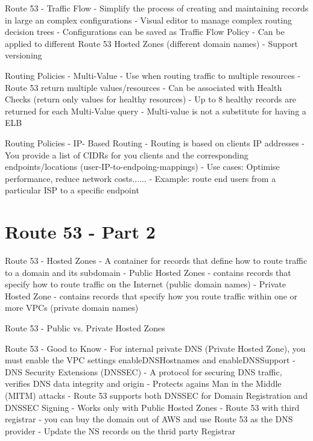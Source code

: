 \documentclass[11pt]{book}
\begin{document}

    Route 53 - Traffic Flow
    - Simplify the process of creating and maintaining records in large an complex configurations
    - Visual editor to manage complex routing decision trees
    - Configurations can be saved as Traffic Flow Policy
        - Can be applied to different Route 53 Hosted Zones (different domain names)
        - Support versioning

    Routing Policies - Multi-Value
    - Use when routing traffic to multiple resources
    - Route 53 return multiple values/resources
    - Can be associated with Health Checks (return only values for healthy resources)
    - Up to 8 healthy records are returned for each Multi-Value query
    - Multi-value is not a substitute for having a ELB

    Routing Policies - IP- Based Routing
    - Routing is based on clients IP addresses
    - You provide a list of CIDRs for you clients and the corresponding endpoints/locations (user-IP-to-endpoing-mappings)
    - Use cases: Optimise performance, reduce network costs......
    - Example: route end users from a particular ISP to a specific endpoint

    \section{Route 53 - Part 2}
    Route 53 - Hosted Zones
    - A container for records that define how to route traffic to a domain and its subdomain
    - Public Hosted Zones - contains records that specify how to route traffic on the Internet (public domain names)
    - Private Hosted Zone - contains records that specify how you route traffic within one or more VPCs (private domain names)

    Route 53 - Public vs. Private Hosted Zones

    Route 53 - Good to Know
    - For internal private DNS (Private Hosted Zone), you must enable the VPC settings enableDNSHostnames and enableDNSSupport
    - DNS Security Extensions (DNSSEC)
        - A protocol for securing DNS traffic, verifies DNS data integrity and origin
        - Protects agains Man in the Middle (MITM) attacks
        - Route 53 supports both DNSSEC for Domain Registration and DNSSEC Signing
        - Works only with Public Hosted Zones
    - Route 53 with third registrar
        - you can buy the domain out of AWS and use Route 53 as the DNS provider
        - Update the NS records on the thrid party Registrar
\end{document}
